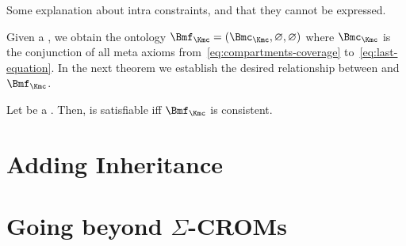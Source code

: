 Some explanation about intra constraints, and that they cannot be expressed.

\todo[inline]{\vspace{2cm}}

Given a \SCCROM{} \Kmc, we obtain the \ALCSHOIQ ontology
$\Bmf_{\Kmc} = (\Bmc_{\Kmc}, \emptyset, \emptyset)$ where $\Bmc_{\Kmc}$ is the conjunction of all
meta axioms from~\eqref{eq:compartments-coverage} to~\eqref{eq:last-equation}. In the next theorem
we establish the desired relationship between \Kmc and $\Bmf_{\Kmc}$.

\begin{theorem}
  Let \Kmc be a \SCCROM. Then, \Kmc is satisfiable iff $\Bmf_{\Kmc}$ is consistent.
\end{theorem}

\missingproof[5cm]





\clearpage

\section{Adding Inheritance}
\label{sec:adding-inheritance}



\section{Going beyond \texorpdfstring{$\Sigma$}{Sigma}-CROMs}
\label{sec:going-beyond-crom}









